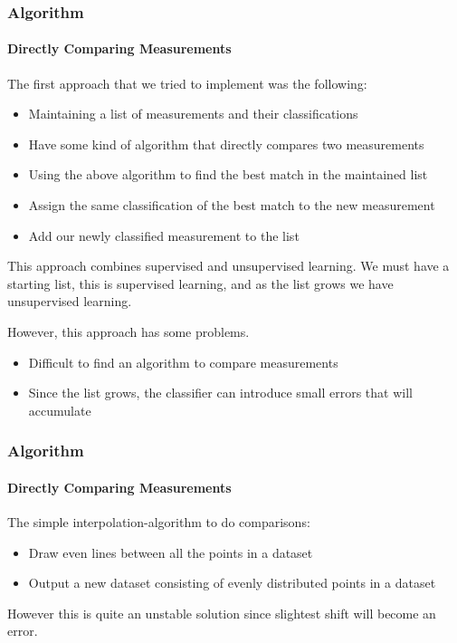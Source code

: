 \documentclass{beamer}
\begin{document}
\begin{frame}[shrink]
\frametitle{Algorithm}
\framesubtitle{Directly Comparing Measurements}

The first approach that we tried to implement was the following:

\begin{itemize}
\pause
\item{Maintaining a list of measurements and their classifications}
\pause
\item{Have some kind of algorithm that directly compares two measurements}
\pause
\item{Using the above algorithm to find the best match in the maintained list}
\pause
\item{Assign the same classification of the best match to the new measurement}
\pause
\item{Add our newly classified measurement to the list}
\end{itemize}

\pause
This approach combines supervised and unsupervised learning. We must have a starting list, this is supervised learning, and as the list grows we have unsupervised learning.

\pause
\vspace{10pt}

However, this approach has some problems.

\begin{itemize}
\pause
\item{Difficult to find an algorithm to compare measurements}
\pause
\item{Since the list grows, the classifier can introduce small errors that will accumulate}
\end{itemize}

\end{frame}

\begin{frame}
\frametitle{Algorithm}
\framesubtitle{Directly Comparing Measurements}

The simple interpolation-algorithm to do comparisons:

\begin{itemize}
\pause
\item{Draw even lines between all the points in a dataset}
\pause
\item{Output a new dataset consisting of evenly distributed points in a dataset}
\end{itemize}

\pause
However this is quite an unstable solution since slightest shift will become an error.


\end{frame}
\end{document}
